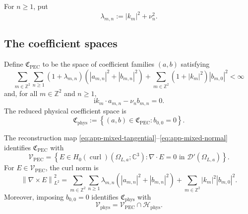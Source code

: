 \documentclass[11pt]{article}
\providecommand{\C}{\mathbb{C}}
\providecommand{\Z}{\mathbb{Z}}
\providecommand{\ii}{\mathrm{i}}
\providecommand{\abs}[1]{\left\lvert #1\right\rvert}
\providecommand{\norm}[1]{\left\lVert #1\right\rVert}
\providecommand{\set}[1]{\left\{#1\right\}}
\providecommand{\paren}[1]{\left(#1\right)}
\providecommand{\OmegaLa}{\Omega_{L,a}}
\providecommand{\Hphys}{\mathcal H_{\mathrm{phys}}}
\providecommand{\VPEC}{\mathcal V_{\mathrm{PEC}}}
\providecommand{\Vphys}{\mathcal V_{\mathrm{phys}}}
\providecommand{\Hzcurl}{H_0(\operatorname{curl})}
\numberwithin{equation}{section}
\begin{document}
For \(n\ge1\), put
\begin{equation}
\label{eq:app-lambda-mn}
    \lambda_{m,n}:=\abs{k_m}^2+\nu_n^2 .
\end{equation}

\subsection{The coefficient spaces}
\label{app:subsec:coefficient-spaces}

Define \(\mathfrak C_{\mathrm{PEC}}\) to be the space of coefficient families
\((a,b)\) satisfying
\begin{equation}
\label{eq:app-CPEC-summability}
    \sum_{m\in\Z^2}\sum_{n\ge1}
    (1+\lambda_{m,n})
    \paren{\abs{a_{m,n}}^2+\abs{b_{m,n}}^2}
    +
    \sum_{m\in\Z^2}(1+\abs{k_m}^2)\abs{b_{m,0}}^2
    <\infty
\end{equation}
and, for all \(m\in\Z^2\) and \(n\ge1\),
\begin{equation}
\label{eq:app-div-constraint}
    \ii k_m\cdot a_{m,n}-\nu_n b_{m,n}=0 .
\end{equation}
The reduced physical coefficient space is
\begin{equation}
\label{eq:app-Cphys}
    \mathfrak C_{\mathrm{phys}}
    :=
    \set{(a,b)\in\mathfrak C_{\mathrm{PEC}}: b_{0,0}=0} .
\end{equation}

\begin{lemma}
\label{lem:app-fourier-characterization}
The reconstruction map \eqref{eq:app-mixed-tangential}--\eqref{eq:app-mixed-normal}
identifies \(\mathfrak C_{\mathrm{PEC}}\) with
\[
    \VPEC=
    \set{E\in\Hzcurl(\OmegaLa;\C^3):\nabla\cdot E=0
    \text{ in }\mathcal D'(\OmegaLa)} .
\]
For \(E\in\VPEC\), the curl norm is
\begin{equation}
\label{eq:app-curl-norm-diagonal}
    \norm{\nabla\times E}_{L^2}^2
    =
    \sum_{m\in\Z^2}\sum_{n\ge1}
    \lambda_{m,n}
    \paren{\abs{a_{m,n}}^2+\abs{b_{m,n}}^2}
    +
    \sum_{m\in\Z^2}\abs{k_m}^2\abs{b_{m,0}}^2 .
\end{equation}
Moreover, imposing \(b_{0,0}=0\) identifies \(\mathfrak C_{\mathrm{phys}}\) with
\[
    \Vphys=\VPEC\cap\Hphys .
\]
\end{lemma}
\end{document}
